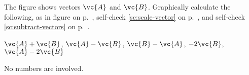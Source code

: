  The figure shows vectors $\vc{A}$ and $\vc{B}$. 
Graphically calculate the following, as in 
figure  on p.~\pageref{fig:tip-to-tail}, self-check
\ref{sc:scale-vector} on p.~\pageref{sc:scale-vector}, and self-check
\ref{sc:subtract-vectors} on p.~\pageref{sc:subtract-vectors}.

         $\vc{A}+\vc{B}$,  $\vc{A}-\vc{B}$,  $\vc{B}-\vc{A}$,  $-2\vc{B}$,  $\vc{A}-2\vc{B}$

\noindent No numbers are involved.
